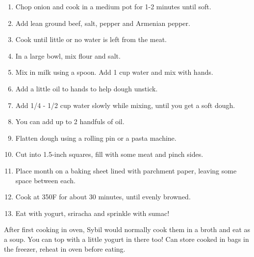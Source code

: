 \begin{enumerate}
    \item Chop onion and cook in a medium pot for 1-2 minutes until soft.
    \item Add lean ground beef, salt, pepper and Armenian pepper.
    \item Cook until little or no water is left from the meat.
    
    \item In a large bowl, mix flour and salt.
    \item Mix in milk using a spoon. Add 1 cup water and mix with hands.
    \item Add a little oil to hands to help dough unstick.
    \item Add 1/4 - 1/2 cup water slowly while mixing, until you get a soft dough.
    \item You can add up to 2 handfuls of oil.
    
    \item Flatten dough using a rolling pin or a pasta machine.
    \item Cut into 1.5-inch squares, fill with some meat and pinch sides.
    \item Place month on a baking sheet lined with parchment paper, leaving some space between each.
    \item Cook at 350\degree F for about 30 minutes, until evenly browned.
    \item Eat with yogurt, sriracha and sprinkle with sumac!
\end{enumerate}

After first cooking in oven, Sybil would normally cook them in a broth and eat as a soup. You can top with a little yogurt in there too!
Can store cooked in bags in the freezer, reheat in oven before eating.
